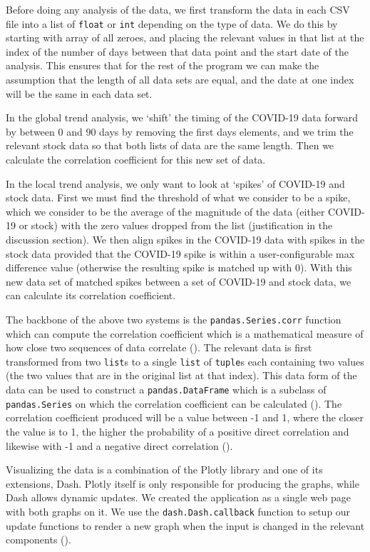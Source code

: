 \documentclass[fontsize=11pt]{article}
\begin{document}
Before doing any analysis of the data, we first transform the data in each CSV file into a list of \texttt{float} or \texttt{int} depending on the type of data.
We do this by starting with array of all zeroes, and placing the relevant values in that list at the index of the number of days between that data point and the start date of the analysis.
This ensures that for the rest of the program we can make the assumption that the length of all data sets are equal, and the date at one index will be the same in each data set.

In the global trend analysis, we `shift' the timing of the COVID-19 data forward by between 0 and 90 days by removing the first days elements, and we trim the relevant stock data so that both lists of data are the same length.
Then we calculate the correlation coefficient for this new set of data.

In the local trend analysis, we only want to look at `spikes' of COVID-19 and stock data.
First we must find the threshold of what we consider to be a spike, which we consider to be the average of the magnitude of the data (either COVID-19 or stock) with the zero values dropped from the list (justification in the discussion section).
We then align spikes in the COVID-19 data with spikes in the stock data provided that the COVID-19 spike is within a user-configurable max difference value (otherwise the resulting spike is matched up with 0).
With this new data set of matched spikes between a set of COVID-19 and stock data, we can calculate its correlation coefficient.

The backbone of the above two systems is the \texttt{pandas.Series.corr} function which can compute the correlation coefficient which is a mathematical measure of how close two sequences of data correlate (\cite{pandaseriescorr}).
The relevant data is first transformed from two \texttt{list}s to a single \texttt{list} of \texttt{tuple}s each containing two values (the two values that are in the original list at that index).
This data form of the data can be used to construct a \texttt{pandas.DataFrame} which is a subclass of \texttt{pandas.Series} on which the correlation coefficient can be calculated (\cite{pandaseries}).
The correlation coefficient produced will be a value between -1 and 1, where the closer the value is to 1, the higher the probability of a positive direct correlation and likewise with -1 and a negative direct correlation (\cite{pandaseriescorr}).

Visualizing the data is a combination of the Plotly library and one of its extensions, Dash.
Plotly itself is only responsible for producing the graphs, while Dash allows dynamic updates.
We created the application as a single web page with both graphs on it.
We use the \texttt{dash.Dash.callback} function to setup our update functions to render a new graph when the input is changed in the relevant components (\cite{dash}).
\end{document}
